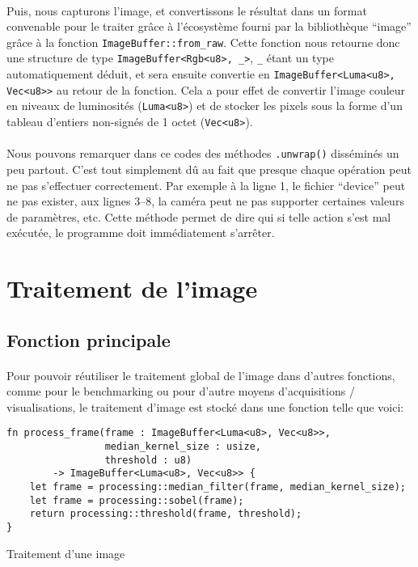 \documentclass{report}
\begin{document}
\paragraph{} Puis, nous capturons l'image, et convertissons le résultat dans un
format convenable pour le traiter grâce à l'écosystème fourni par la
bibliothèque ``image'' grâce à la fonction
\texttt{ImageBuffer::from_raw}. Cette fonction nous retourne donc
une structure de type \texttt{ImageBuffer<Rgb<u8>, _>},
\texttt{_} étant un type automatiquement déduit, et sera ensuite
convertie en \texttt{ImageBuffer<Luma<u8>, Vec<u8>>} au retour de
la fonction. Cela a pour effet de convertir l'image couleur en niveaux de
luminosités (\texttt{Luma<u8>}) et de stocker les pixels sous la
forme d'un tableau d'entiers non-signés de 1 octet
(\texttt{Vec<u8>}).

\paragraph{} Nous pouvons remarquer dans ce codes des méthodes
\texttt{.unwrap()} disséminés un peu partout. C'est tout simplement
dû au fait que presque chaque opération peut ne pas s'effectuer correctement.
Par exemple à la ligne 1, le fichier ``device'' peut ne pas exister, aux lignes
3--8, la caméra peut ne pas supporter certaines valeurs de paramètres, etc.
Cette méthode permet de dire qui si telle action s'est mal exécutée, le
programme doit immédiatement s'arrêter.

\section{Traitement de l'image}

\subsection{Fonction principale}

\paragraph{} Pour pouvoir réutiliser le traitement global de l'image dans
d'autres fonctions, comme pour le benchmarking ou pour d'autre moyens
d'acquisitions / visualisations, le traitement d'image est stocké dans une
fonction telle que voici:\\

\begin{listing}[H]
\begin{verbatim}
fn process_frame(frame : ImageBuffer<Luma<u8>, Vec<u8>>,
                 median_kernel_size : usize,
                 threshold : u8)
		-> ImageBuffer<Luma<u8>, Vec<u8>> {
	let frame = processing::median_filter(frame, median_kernel_size);
	let frame = processing::sobel(frame);
	return processing::threshold(frame, threshold);
}
\end{verbatim}
\label{lst:main_process}
\caption{Traitement d'une image}
\end{listing}
\end{document}
